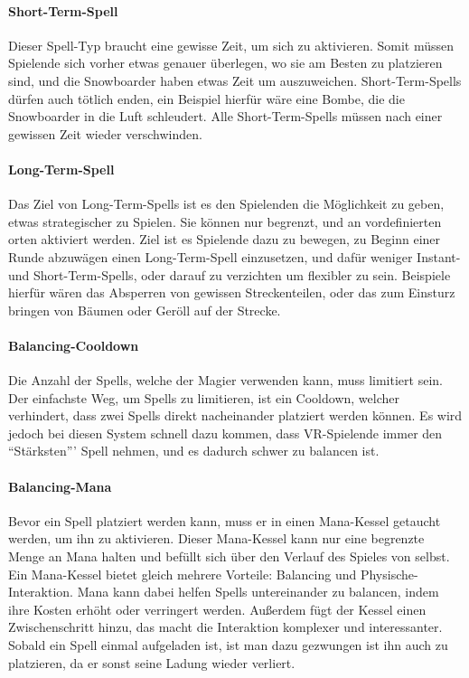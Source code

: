 \paragraph{Short-Term-Spell}
Dieser Spell-Typ braucht eine gewisse Zeit, um sich zu aktivieren. Somit müssen Spielende sich vorher etwas genauer überlegen, wo sie am Besten zu platzieren sind, und die Snowboarder haben etwas Zeit um auszuweichen. Short-Term-Spells dürfen auch tötlich enden, ein Beispiel hierfür wäre eine Bombe, die die Snowboarder in die Luft schleudert. Alle Short-Term-Spells müssen nach einer gewissen Zeit wieder verschwinden.

\paragraph{Long-Term-Spell}
Das Ziel von Long-Term-Spells ist es den Spielenden die Möglichkeit zu geben, etwas strategischer zu Spielen. Sie können nur begrenzt, und an vordefinierten orten aktiviert werden. Ziel ist es Spielende dazu zu bewegen, zu Beginn einer Runde abzuwägen einen Long-Term-Spell einzusetzen, und dafür weniger Instant- und Short-Term-Spells, oder darauf zu verzichten um flexibler zu sein. Beispiele hierfür wären das Absperren von gewissen Streckenteilen, oder das zum Einsturz bringen von Bäumen oder Geröll auf der Strecke.

\paragraph{Balancing-Cooldown}
Die Anzahl der Spells, welche der Magier verwenden kann, muss limitiert sein. Der einfachste Weg, um Spells zu limitieren, ist ein Cooldown, welcher verhindert, dass zwei Spells direkt nacheinander platziert werden können. Es wird jedoch bei diesen System schnell dazu kommen, dass VR-Spielende immer den "`Stärksten"'' Spell nehmen, und es dadurch schwer zu balancen ist.

\paragraph{Balancing-Mana\label{_mana}}
Bevor ein Spell platziert werden kann, muss er in einen Mana-Kessel getaucht werden, um ihn zu aktivieren. Dieser Mana-Kessel kann nur eine begrenzte Menge an Mana halten und befüllt sich über den Verlauf des Spieles von selbst. Ein Mana-Kessel bietet gleich mehrere Vorteile: Balancing und Physische-Interaktion. Mana kann dabei helfen Spells untereinander zu balancen, indem ihre Kosten erhöht oder verringert werden. Außerdem fügt der Kessel einen Zwischenschritt hinzu, das macht die Interaktion komplexer und interessanter. Sobald ein Spell einmal aufgeladen ist, ist man dazu gezwungen ist ihn auch zu platzieren, da er sonst seine Ladung wieder verliert.

